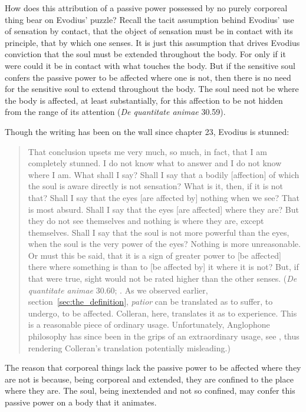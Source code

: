 \documentclass[12pt]{article}
\begin{document}
How does this attribution of a passive power possessed by no purely corporeal thing bear on Evodius' puzzle? Recall the tacit assumption behind Evodius' use of sensation by contact, that the object of sensation must be in contact with its principle, that by which one senses. It is just this assumption that drives Evodius conviction that the soul must be extended throughout the body. For only if it were could it be in contact with what touches the body. But if the sensitive soul confers the passive power to be affected where one is not, then there is no need for the sensitive soul to extend throughout the body. The soul need not be where the body is affected, at least substantially, for this affection to be not hidden from the range of its attention (\emph{De quantitate animae} 30.59). 

Though the writing has been on the wall since chapter 23, Evodius is stunned:
\begin{quote}
	That conclusion upsets me very much, so much, in fact, that I am completely stunned. I do not know what to answer and I do not know where I am. What shall I say? Shall I say that a bodily [affection] of which the soul is aware directly is not sensation? What is it, then, if it is not that? Shall I say that the eyes [are affected by] nothing when we see? That is most absurd. Shall I say that the eyes [are affected] where they are? But they do not see themselves and nothing is where they are, except themselves. Shall I say that the soul is not more powerful than the eyes, when the soul is the very power of the eyes? Nothing is more unreasonable. Or must this be said, that it is a sign of greater power to [be affected] there where something is than to [be affected by] it where it is not? But, if that were true, sight would not be rated higher than the other senses. (\emph{De quantitate animae} 30.60; \citealt[87]{Colleran:1949ys}. As we observed earlier, section~\ref{sec:the_definition}, \emph{patior} can be translated as to suffer, to undergo, to be affected. Colleran, here, translates it as to experience. This is a reasonable piece of ordinary usage. Unfortunately, Anglophone philosophy has since been in the grips of an extraordinary usage, see \citealt{Hinton:1973js}, thus rendering Colleran's translation potentially misleading.)
\end{quote}
The reason that corporeal things lack the passive power to be affected where they are not is because, being corporeal and extended, they are confined to the place where they are. The soul, being inextended and not so confined, may confer this passive power on a body that it animates.
\end{document}
